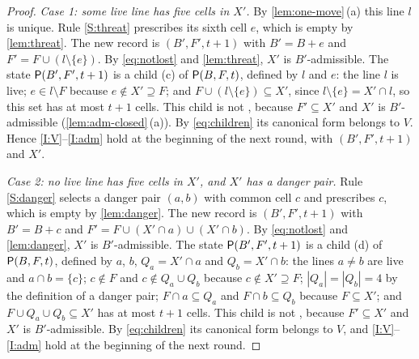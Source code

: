 \begin{proof}
\smallskip\noindent\emph{Case 1: some live line has five cells in $X'$.} By \cref{lem:one-move}\,(a) this
line $l$ is unique. Rule \ref{S:threat} prescribes its sixth cell $e$, which is empty by
\cref{lem:threat}. The new record is $(B',F',t+1)$ with $B'=B+e$ and $F'=F\cup(l\setminus\{e\})$. By
\eqref{eq:notlost} and \cref{lem:threat}, $X'$ is $B'$-admissible. The state $\mathsf{P}(B',F',t+1)$ is a child
\textup{(c)} of $\mathsf{P}(B,F,t)$, defined by $l$ and $e$: the line $l$ is live; $e\in l\setminus F$
because $e\notin X'\supseteq F$; and $F\cup(l\setminus\{e\})\subseteq X'$, since
$l\setminus\{e\}=X'\cap l$, so this set has at most $t+1$ cells. This child is not \VOID, because
$F'\subseteq X'$ and $X'$ is $B'$-admissible (\cref{lem:adm-closed}\,(a)). By \eqref{eq:children} its
canonical form belongs to $V$. Hence \ref{I:V}--\ref{I:adm} hold at the beginning of the next round, with
$(B',F',t+1)$ and $X'$.

\smallskip\noindent\emph{Case 2: no live line has five cells in $X'$, and $X'$ has a danger pair.} Rule
\ref{S:danger} selects a danger pair $(a,b)$ with common cell $c$ and prescribes $c$, which is empty by
\cref{lem:danger}. The new record is $(B',F',t+1)$ with $B'=B+c$ and
$F'=F\cup(X'\cap a)\cup(X'\cap b)$. By \eqref{eq:notlost} and \cref{lem:danger}, $X'$ is $B'$-admissible.
The state $\mathsf{P}(B',F',t+1)$ is a child \textup{(d)} of $\mathsf{P}(B,F,t)$, defined by $a$, $b$, $Q_a=X'\cap a$ and
$Q_b=X'\cap b$: the lines $a\ne b$ are live and $a\cap b=\{c\}$; $c\notin F$ and $c\notin Q_a\cup Q_b$ because
$c\notin X'\supseteq F$; $|Q_a|=|Q_b|=4$ by the definition of a danger pair; $F\cap a\subseteq Q_a$ and
$F\cap b\subseteq Q_b$ because $F\subseteq X'$; and $F\cup Q_a\cup Q_b\subseteq X'$ has at most $t+1$ cells.
This child is not \VOID, because $F'\subseteq X'$ and $X'$ is $B'$-admissible. By \eqref{eq:children} its
canonical form belongs to $V$, and \ref{I:V}--\ref{I:adm} hold at the beginning of the next round.


\end{proof}
